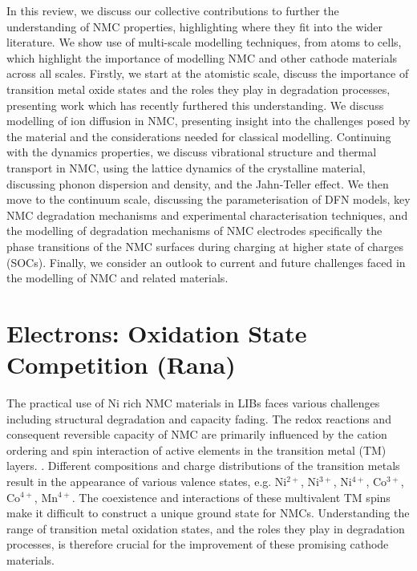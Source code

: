 \documentclass[journal=jacsat,manuscript=article]{achemso}
\begin{document}
In this review, we discuss our collective contributions to further the understanding of NMC properties, highlighting where they fit into the wider literature. We show use of multi-scale modelling techniques, from atoms to cells, which highlight the importance of modelling NMC and other cathode materials across all scales. Firstly, we start at the atomistic scale, discuss the importance of transition metal oxide states and the roles they play in degradation processes, presenting work which has recently furthered this understanding. We discuss modelling of ion diffusion in NMC, presenting insight into the challenges posed by the material and the considerations needed for classical modelling. Continuing with the dynamics properties, we discuss vibrational structure and thermal transport in NMC, using the lattice dynamics of the crystalline material, discussing phonon dispersion and density, and the Jahn-Teller effect. We then move to the continuum scale, discussing the parameterisation of DFN models, key NMC degradation mechanisms and experimental characterisation techniques, and the modelling of degradation mechanisms of NMC electrodes specifically the phase transitions of the NMC surfaces during charging at higher state of charges (SOCs). Finally, we consider an outlook to current and future challenges faced in the modelling of NMC and related materials.

\section{Electrons: Oxidation State Competition (Rana)}
The practical use of Ni rich NMC materials in LIBs faces various challenges including structural degradation and capacity fading.  The redox reactions and consequent reversible capacity of NMC are primarily influenced by the cation ordering and spin interaction of active elements in the transition metal (TM) layers. \cite{Li-acsami-2020,Maleki-aenm.2019,Feng-2019, Xia2018, Xiao_NanoEner2018}. Different compositions and charge distributions of the transition metals result in the appearance of various valence states, e.g. Ni$^{2+}$, Ni$^{3+}$, Ni$^{4+}$, Co$^{3+}$, Co$^{4+}$, Mn$^{4+}$. \cite{Xiao_NanoEner2018} The coexistence and interactions of these multivalent TM spins make it difficult to construct a unique ground state for NMCs. \cite{Xiao_NanoEner2018} 
Understanding the range of transition metal oxidation states, and the roles they play in degradation processes, is therefore crucial for the improvement of these promising cathode materials.
\end{document}
